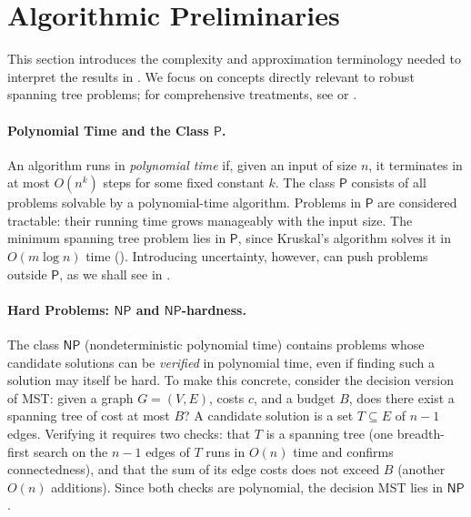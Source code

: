 
% 
% 
\section{Algorithmic Preliminaries}\label{sec:complexity}

This section introduces the complexity and approximation terminology needed to interpret the results in .
We focus on concepts directly relevant to robust spanning tree problems; for comprehensive treatments, see \cite[Chapter~2]{Goerigk2021RCO} or \cite[Chapter~15]{KorteVygen2018}.

\paragraph{Polynomial Time and the Class $\mathsf{P}$.}

An algorithm runs in \emph{\textcolor{RWTHBlue}{polynomial time}} if, given an input of size $n$, it terminates in at most $O(n^k)$ steps for some fixed constant $k$.
The class $\mathsf{P}$ consists of all problems solvable by a polynomial-time algorithm.
Problems in $\mathsf{P}$ are considered tractable: their running time grows manageably with the input size.
The minimum spanning tree problem lies in $\mathsf{P}$, since Kruskal's algorithm solves it in $O(m \log n)$ time ().
Introducing uncertainty, however, can push problems outside $\mathsf{P}$, as we shall see in .

\paragraph{Hard Problems: $\mathsf{NP}$ and $\mathsf{NP}$-hardness.}

The class $\mathsf{NP}$ (nondeterministic polynomial time) contains problems whose candidate solutions can be \emph{verified} in polynomial time, even if finding such a solution may itself be hard.
To make this concrete, consider the decision version of MST: given a graph $G = (V, E)$, costs $c$, and a budget $B$, does there exist a spanning tree of cost at most $B$?
A candidate solution is a set $T \subseteq E$ of $n - 1$ edges.
Verifying it requires two checks: that $T$ is a spanning tree (one breadth-first search on the $n - 1$ edges of $T$ runs in $O(n)$ time and confirms connectedness), and that the sum of its edge costs does not exceed $B$ (another $O(n)$ additions).
Since both checks are polynomial, the decision MST lies in $\mathsf{NP}$.

